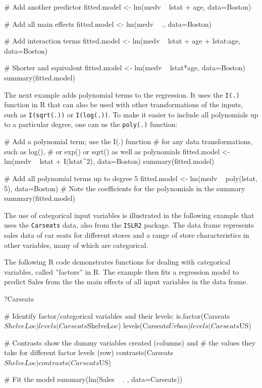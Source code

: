 \begin{samepage}
\begin{Rcode}
# Add another predictor
fitted.model <- lm(medv ~ lstat + age, data=Boston)

# Add all main effects
fitted.model <- lm(medv ~ ., data=Boston)

# Add interaction terms
fitted.model <- lm(medv ~ lstat + age + lstat:age, data=Boston)
   
# Shorter and equivalent
fitted.model <- lm(medv ~ lstat*age, data=Boston)
summary(fitted.model)
\end{Rcode}
\end{samepage}

The next example adds polynomial terms to the regression. It uses the \texttt{I(.)} function in R that can also be used with other transformations of the inputs, such as \texttt{I(sqrt(.))} or \texttt{I(log(.))}. To make it easier to include all polynomials up to a particular degree, one can us the \texttt{poly(.)} function:

\begin{samepage}
\begin{Rcode}
# Add a polynomial term; use the I(.) function
# for any data transformations, such as log(),
# or exp() or sqrt() as well as polynomials
fitted.model <- lm(medv ~ lstat + I(lstat^2), data=Boston)
summary(fitted.model)

# Add all polynomial terms up to degree 5
fitted.model <- lm(medv ~ poly(lstat, 5), data=Boston)
# Note the coefficients for the polynomials in the summary
summary(fitted.model)
\end{Rcode}
\end{samepage}

The use of categorical input variables is illustrated in the following example that uses the \texttt{Carseats} data, also from the \texttt{ISLR2} package. The data frame represents sales data of car seats for different stores and a range of store characteristics in other variables, many of which are categorical. 

The following R code demonstrates functions for dealing with categorical variables, called ''factors'' in R. The example then fits a regression model to predict Sales from the the main effects of all input variables in the data frame.

\begin{samepage}
\begin{Rcode}
?Carseats

# Identify factor/categorical variables and their levels:
is.factor(Carseats$ShelveLoc)
levels(Carseats$ShelveLoc)
levels(Carseats$Urban)
levels(Carseats$US)

# Contrasts show the dummy variables created (columns) and 
# the values they take for different  factor levels (row)
contrasts(Carseats$ShelveLoc)
contrasts(Carseats$US)

# Fit the model
summary(lm(Sales ~ . , data=Carseats))
\end{Rcode}
\end{samepage}


